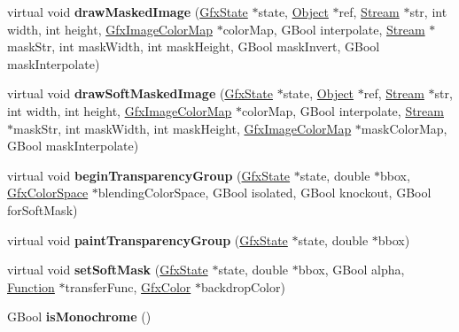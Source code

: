 \begin{DoxyCompactItemize}
virtual void {\bfseries draw\+Masked\+Image} (\hyperlink{class_gfx_state}{Gfx\+State} $\ast$state, \hyperlink{class_object}{Object} $\ast$ref, \hyperlink{class_stream}{Stream} $\ast$str, int width, int height, \hyperlink{class_gfx_image_color_map}{Gfx\+Image\+Color\+Map} $\ast$color\+Map, G\+Bool interpolate, \hyperlink{class_stream}{Stream} $\ast$mask\+Str, int mask\+Width, int mask\+Height, G\+Bool mask\+Invert, G\+Bool mask\+Interpolate)
\item 
\mbox{\label{class_pre_scan_output_dev_a051889b4fcd336bc2412ee0e9d62e99c}} 
virtual void {\bfseries draw\+Soft\+Masked\+Image} (\hyperlink{class_gfx_state}{Gfx\+State} $\ast$state, \hyperlink{class_object}{Object} $\ast$ref, \hyperlink{class_stream}{Stream} $\ast$str, int width, int height, \hyperlink{class_gfx_image_color_map}{Gfx\+Image\+Color\+Map} $\ast$color\+Map, G\+Bool interpolate, \hyperlink{class_stream}{Stream} $\ast$mask\+Str, int mask\+Width, int mask\+Height, \hyperlink{class_gfx_image_color_map}{Gfx\+Image\+Color\+Map} $\ast$mask\+Color\+Map, G\+Bool mask\+Interpolate)
\item 
\mbox{\label{class_pre_scan_output_dev_a5ee851d51d01bddbc0a006b70ee5477f}} 
virtual void {\bfseries begin\+Transparency\+Group} (\hyperlink{class_gfx_state}{Gfx\+State} $\ast$state, double $\ast$bbox, \hyperlink{class_gfx_color_space}{Gfx\+Color\+Space} $\ast$blending\+Color\+Space, G\+Bool isolated, G\+Bool knockout, G\+Bool for\+Soft\+Mask)
\item 
\mbox{\label{class_pre_scan_output_dev_a39719d02b42d4cced04e2e8d1c835be4}} 
virtual void {\bfseries paint\+Transparency\+Group} (\hyperlink{class_gfx_state}{Gfx\+State} $\ast$state, double $\ast$bbox)
\item 
\mbox{\label{class_pre_scan_output_dev_a1fad528eb71421102cd161848d93dceb}} 
virtual void {\bfseries set\+Soft\+Mask} (\hyperlink{class_gfx_state}{Gfx\+State} $\ast$state, double $\ast$bbox, G\+Bool alpha, \hyperlink{class_function}{Function} $\ast$transfer\+Func, \hyperlink{struct_gfx_color}{Gfx\+Color} $\ast$backdrop\+Color)
\item 
\mbox{\label{class_pre_scan_output_dev_aae59c9b1f4bed01ac8c14bf7f6bb7b0c}} 
G\+Bool {\bfseries is\+Monochrome} ()

\end{DoxyCompactItemize}
